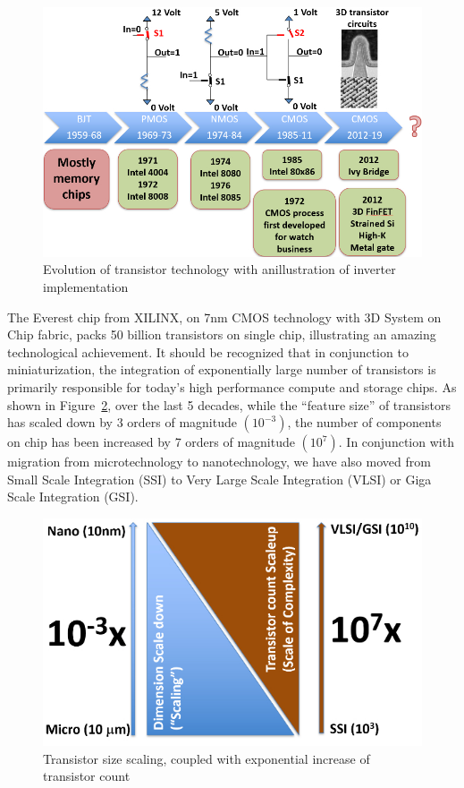 \begin{multicols}{2}
\begin{figure}[H]
\centering
\includegraphics[scale=1.2]{src/Figures/chap1/chap1-fig02.jpg}
\caption{Evolution of transistor technology with an\break illustration of inverter implementation}\label{chap1-fig2}
\end{figure}

The Everest chip from  XILINX, on 7nm CMOS technology with 3D System on Chip fabric, packs 50 billion transistors on single chip, illustrating an amazing technological achievement. It should be recognized that in conjunction to miniaturization, the integration of  exponentially large number of transistors is primarily responsible for today’s high performance compute and storage chips. As shown in Figure~\ref{chap1-fig3}, over the last 5 decades, while the “feature size” of transistors has scaled down by  3 orders of magnitude $(10^{-3})$, the number of components on chip has been increased by 7 orders of magnitude $(10^7)$. In conjunction with migration from microtechnology to nanotechnology, we have also moved from Small Scale Integration (SSI) to Very Large Scale Integration (VLSI) or Giga Scale Integration (GSI).

\begin{figure}[H]
\centering
\includegraphics[scale=1.3]{src/Figures/chap1/chap1-fig03.jpg}
\caption{Transistor size scaling, coupled with exponential increase of transistor count}\label{chap1-fig3}
\end{figure}


\end{multicols}
